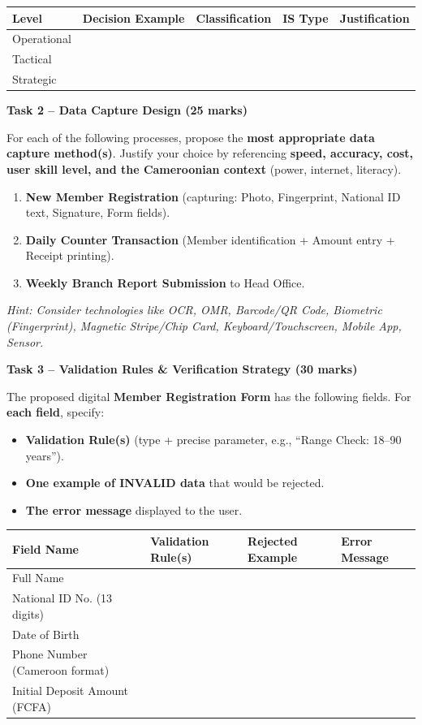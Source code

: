 \documentclass[11pt]{article}
\begin{document}
\begin{center}
\begin{tabularx}{\linewidth}{|l|X|X|l|X|}
\hline
\rowcolor{popblueL}
\textbf{Level} & \textbf{Decision Example} & \textbf{Classification} & \textbf{IS Type} & \textbf{Justification} \\
\hline
Operational &  &  &  &  \\
\hline
Tactical &  &  &  &  \\
\hline
Strategic &  &  &  &  \\
\hline
\end{tabularx}
\end{center}

\medskip
\noindent\textbf{Task 2 -- Data Capture Design (25 marks)}

For each of the following processes, propose the \textbf{most appropriate data capture method(s)}. Justify your choice by referencing \textbf{speed, accuracy, cost, user skill level, and the Cameroonian context} (power, internet, literacy).
\begin{enumerate}
    \item \textbf{New Member Registration} (capturing: Photo, Fingerprint, National ID text, Signature, Form fields).
    \item \textbf{Daily Counter Transaction} (Member identification + Amount entry + Receipt printing).
    \item \textbf{Weekly Branch Report Submission} to Head Office.
\end{enumerate}
\emph{Hint: Consider technologies like OCR, OMR, Barcode/QR Code, Biometric (Fingerprint), Magnetic Stripe/Chip Card, Keyboard/Touchscreen, Mobile App, Sensor.}

\medskip
\noindent\textbf{Task 3 -- Validation Rules \& Verification Strategy (30 marks)}

The proposed digital \textbf{Member Registration Form} has the following fields. For \textbf{each field}, specify:
\begin{itemize}
    \item \textbf{Validation Rule(s)} (type + precise parameter, e.g., ``Range Check: 18--90 years'').
    \item \textbf{One example of INVALID data} that would be rejected.
    \item \textbf{The error message} displayed to the user.
\end{itemize}

\begin{center}
\begin{tabularx}{\linewidth}{|l|X|X|X|}
\hline
\rowcolor{popblueL}
\textbf{Field Name} & \textbf{Validation Rule(s)} & \textbf{Rejected Example} & \textbf{Error Message} \\
\hline
Full Name &  &  &  \\
\hline
National ID No. (13 digits) &  &  &  \\
\hline
Date of Birth &  &  &  \\
\hline
Phone Number (Cameroon format) &  &  &  \\
\hline
Initial Deposit Amount (FCFA) &  &  &  \\
\hline
\end{tabularx}
\end{center}
\end{document}
